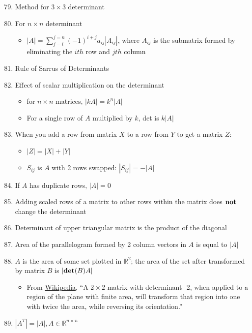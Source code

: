 \documentclass[10pt,letterpaper]{article}
\begin{document}
\begin{enumerate}
\setcounter{enumi}{78}
\item  Method for $3 \times 3$ determinant
\item For $n \times n$ determinant

\begin{itemize}
\item $\displaystyle |A| = \sum ^{j=n} _{j=i} (-1)^{i+j} a _{ij} |A _{ij} |$, where $A _{ij}$ is the submatrix formed by eliminating the $ith$ row and $jth$ column
\end{itemize}

\setcounter{enumi}{81}
\item  Rule of Sarrus of Determinants
\item Effect of scalar multiplication on the determinant

\begin{itemize}
\item for $n \times n$ matrices, $|k A| = k^n |A|$
\item For a single row of $A$ multiplied by $k$, det is $k|A|$
\end{itemize}

\setcounter{enumi}{84}
\item  When you add a row from matrix $X$ to a row from $Y$ to get a matrix $Z$:

\begin{itemize}
\item $|Z| = |X| + |Y|$
\item $S _{ij}$ is $A$ with 2 rows swapped: $|S _{ij} | = -|A|$
\end{itemize}

\item If $A$ has duplicate rows, $|A|=0$
\item Adding scaled rows of a matrix to other rows within the matrix does ${\bf not}$ change the determinant
\item Determinant of upper triangular matrix is the product of the diagonal
\setcounter{enumi}{89}
\item  Area of the parallelogram formed by 2 column vectors in $A$ is equal to $|A|$
\item $A$ is the area of some set plotted in $\mathbb{R}^{2}$; the area of the set after transformed by matrix $B$ is $|{\bf det} (B) A|$

\begin{itemize}
\item From \href{http://en.wikipedia.org/wiki/Determinant}{Wikipedia}, ``A $2 \times 2$ matrix with determinant -2, when applied to a region of the plane with finite area, will transform that region into one with twice the area, while reversing its orientation.''
\end{itemize}

\setcounter{enumi}{92}
\item  $| A^T| = |A|, A \in \mathbb{R}^{n\times n}$
\end{enumerate}
\end{document}

